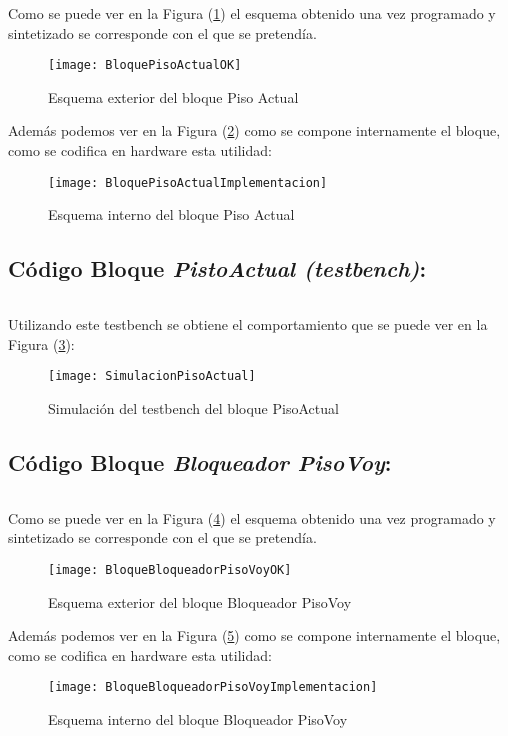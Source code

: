     Como se puede ver en la Figura (\ref{fig:BloquePisoActualOK}) el esquema obtenido una vez programado y sintetizado se corresponde con el que se pretendía.
    \begin{figure}[H]
		    \centering
		    \texttt{[image: BloquePisoActualOK]}
		    \caption{Esquema exterior del bloque Piso Actual}
		    \label{fig:BloquePisoActualOK}
	\end{figure}
    Además podemos ver en la Figura (\ref{fig:BloquePisoActualImplementacion}) como se compone internamente el bloque, como se codifica en hardware esta utilidad:
    \begin{figure}[H]
		    \centering
		    \texttt{[image: BloquePisoActualImplementacion]}
		    \caption{Esquema interno del bloque Piso Actual}
		    \label{fig:BloquePisoActualImplementacion}
	\end{figure}

\subsection{Código Bloque \textit{PistoActual (testbench)}:} \label{code:PisoActual_tb}
    \inputminted[frame=lines,fontsize=\footnotesize,linenos]{vhdl}{CodeFiles/PisoActual_tb.vhd}
    
    Utilizando este testbench se obtiene el comportamiento que se puede ver en la Figura (\ref{fig:SimulacionPisoActual}):

    \begin{figure}[H]
		    \centering
		    \texttt{[image: SimulacionPisoActual]}
		    \caption{Simulación del testbench del bloque PisoActual}
		    \label{fig:SimulacionPisoActual}
	\end{figure}


\subsection{Código Bloque \textit{Bloqueador PisoVoy}:} \label{code:BloqueadorpisoVoy}	
    \inputminted[frame=lines,fontsize=\footnotesize,linenos]{vhdl}{CodeFiles/BloqueadorPisoVoy.vhd}
	Como se puede ver en la Figura (\ref{fig:BloqueBloqueadorPisoVoyOK}) el esquema obtenido una vez programado y sintetizado se corresponde con el que se pretendía.
    \begin{figure}[H]
		    \centering
		    \texttt{[image: BloqueBloqueadorPisoVoyOK]}
		    \caption{Esquema exterior del bloque Bloqueador PisoVoy}
		    \label{fig:BloqueBloqueadorPisoVoyOK}
	\end{figure}
    Además podemos ver en la Figura (\ref{fig:BloqueBloqueadorPisoVoyImplementacion}) como se compone internamente el bloque, como se codifica en hardware esta utilidad:
    \begin{figure}[H]
		    \centering
		    \texttt{[image: BloqueBloqueadorPisoVoyImplementacion]}
		    \caption{Esquema interno del bloque Bloqueador PisoVoy}
		    \label{fig:BloqueBloqueadorPisoVoyImplementacion}
	\end{figure}

